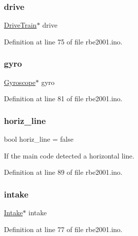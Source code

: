 \subsubsection{\texorpdfstring{drive}{drive}}
{\footnotesize\ttfamily \hyperlink{class_drive_train}{Drive\+Train}$\ast$ drive}



Definition at line 75 of file rbe2001.\+ino.

\mbox{\label{rbe2001_8ino_a8b50650397dca0a575b97ce4cbf21e34}} 
\subsubsection{\texorpdfstring{gyro}{gyro}}
{\footnotesize\ttfamily \hyperlink{class_gyroscope}{Gyroscope}$\ast$ gyro}



Definition at line 81 of file rbe2001.\+ino.

\mbox{\label{rbe2001_8ino_a90bb1c48eba85e2acf136982fcfd628e}} 
\subsubsection{\texorpdfstring{horiz\+\_\+line}{horiz\_line}}
{\footnotesize\ttfamily bool horiz\+\_\+line = false}



If the main code detected a horizontal line. 



Definition at line 89 of file rbe2001.\+ino.

\mbox{\label{rbe2001_8ino_ab0ec7e650c93e5f5c9b4d6490cf9328a}} 
\subsubsection{\texorpdfstring{intake}{intake}}
{\footnotesize\ttfamily \hyperlink{class_intake}{Intake}$\ast$ intake}



Definition at line 77 of file rbe2001.\+ino.

